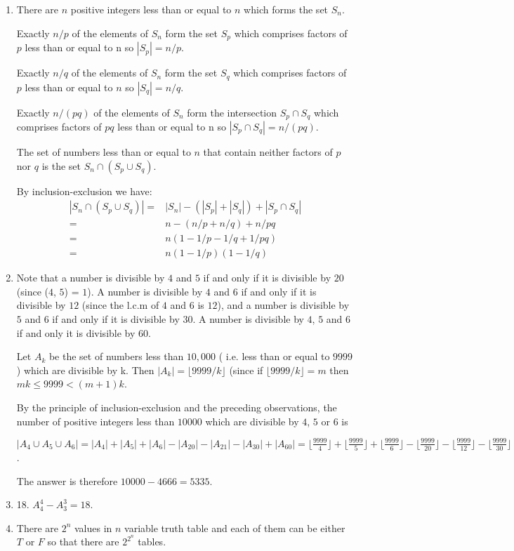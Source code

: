 \documentclass{../../cls/sig-alternate-05-2015}
\begin{document}
\begin{enumerate}
    \item There are $n$ positive integers less than or equal to $n$ which forms the set $S_n$. 
    
    Exactly $n/p$ of the elements of $S_n$ form the set $S_p$ which comprises factors of $p$ less than or equal to n so $|S_p|=n/p$.
    
    Exactly $n/q$ of the elements of $S_n$ form the set $S_q$ which comprises factors of $p$ less than or equal to $n$ so $|S_q|=n/q$.
    
    Exactly $n/(pq)$ of the elements of $S_n$ form the intersection $S_p\cap S_q$ which comprises factors of $pq$ less than or equal to n so $|S_p \cap S_q|=n/(pq)$. 
    
    The set of numbers less than or equal to $n$ that contain neither factors of $p$ nor $q$ is the set $S_n \cap (S_p \cup S_q)$. 
    
    By inclusion-exclusion we have: 
    \begin{equation}
    \begin{aligned}
    |S_n \cap (S_p \cup S_q)| 
    =& |S_n| - (|S_p| + |S_q|) + |S_p \cap S_q|\\ 
    =& n - (n/p + n/q) + n/pq\\ 
    =& n(1 - 1/p - 1/q + 1/pq)\\
    =& n(1 - 1/p)(1 - 1/q)
    \end{aligned} 
    \end{equation}

    \item Note that a number is divisible by $4$ and $5$ if and only if it
    is divisible by $20$ (since ($4$, $5$) = $1$). A number is divisible by $4$ and $6$
    if and only if it is divisible by $12$ (since the l.c.m of $4$ and $6$ is $12$), and a number is divisible by $5$ and $6$ if and
    only if it is divisible by $30$. A number is divisible by $4$, $5$ and $6$ if and
    only it is divisible by $60$.
    
    Let $A_k$ be the set of numbers less than $10, 000$ ( i.e. less than or equal
    to $9999$ ) which are divisible by k. Then $|A_k| = \lfloor 9999/k \rfloor$ (since if
    $\lfloor 9999/k \rfloor =m$ then $mk \leq 9999 < (m + 1)k$.
    
    By the principle of inclusion-exclusion and the preceding observations,
    the number of positive integers less than $10000$ which are divisible
    by $4$, $5$ or $6$ is
    
    $|A_4\cup A_5 \cup A_6|=|A_4|+|A_5|+|A_6|-|A_{20}|-|A_{21}|-|A_{30}|+|A_{60}|
    =\lfloor \frac{9999}{4} \rfloor+ \lfloor \frac{9999}{5} \rfloor+\lfloor \frac{9999}{6} \rfloor-\lfloor \frac{9999}{20} \rfloor-\lfloor \frac{9999}{12} \rfloor-\lfloor \frac{9999}{30} \rfloor+\lfloor \frac{9999}{60} \rfloor=2499+1999+1666-499-833-333+166=4665$.
    
    The answer is therefore $10000-4666=5335$.
    
    \item 18. $A_4^4 -A_3^3=18.$ 
    
    \item There are $2^n$ values in $n$ variable truth table and each of them can be either $T$ or $F$ so that there are $2^{2^n}$ tables.
\end{enumerate}
\end{document}
